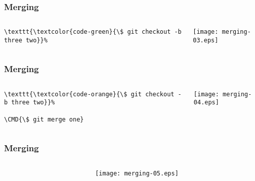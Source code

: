 \documentclass[english]{beamer}
\newcommand{\CMD}[1]{%
\texttt{\textcolor{code-green}{#1}}%
}
\newcommand{\cmd}[1]{%
\texttt{\textcolor{code-orange}{#1}}%
}
\begin{document}
\begin{frame}[fragile]
\frametitle{Merging}

\begin{columns}[t]
        \begin{column}[T]{.5\textwidth}
                {\small
                \begin{Verbatim}[commandchars=\\\{\}]
\CMD{\$ git checkout -b three two}
                \end{Verbatim}
                }
        \end{column}
        \begin{column}[T]{.5\textwidth}
                \texttt{[image: merging-03.eps]}
        \end{column}
\end{columns}
\end{frame}

\begin{frame}[fragile]
\frametitle{Merging}

\begin{columns}[t]
        \begin{column}[T]{.5\textwidth}
                {\small
                \begin{Verbatim}[commandchars=\\\{\}]
\cmd{\$ git checkout -b three two}
\CMD{\$ git merge one}
                \end{Verbatim}
                }
        \end{column}
        \begin{column}[T]{.5\textwidth}
                \texttt{[image: merging-04.eps]}
        \end{column}
\end{columns}
\end{frame}

\begin{frame}
\frametitle{Merging}

\begin{columns}[t]
        \begin{column}[T]{.5\textwidth}
        \end{column}
        \begin{column}[T]{.5\textwidth}
                \texttt{[image: merging-05.eps]}
        \end{column}
\end{columns}
\end{frame}
\end{document}
